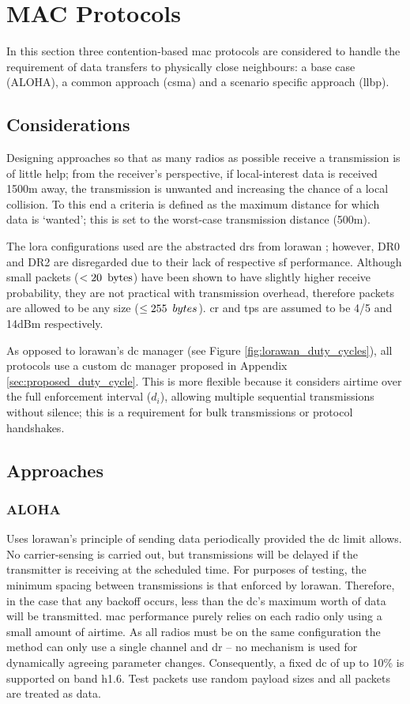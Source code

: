 \chapter{MAC Protocols}\label{sec:protocols}
In this section three contention-based \ac{mac} protocols are considered to handle the requirement of data transfers to physically close neighbours: a base case (ALOHA), a common approach (\ac{csma}) and a scenario specific approach (\ac{llbp}). 

\section{Considerations}\label{sec:mac_considerations}
Designing approaches so that as many radios as possible receive a transmission is of little help; from the receiver's perspective, if local-interest data is received 1500m away, the transmission is unwanted and increasing the chance of a local collision. To this end a criteria is defined as the maximum distance for which data is `wanted'; this is set to the worst-case transmission distance (500m).

The \ac{lora} configurations used are the abstracted \ac{dr}s from \ac{lorawan} \cite{3YP:LORAWAN_REGIONAL_PARAMS}; however, DR0 and DR2 are disregarded due to their lack of respective \ac{sf} performance. Although small packets ($< 20\enskip \text{bytes}$) have been shown to have slightly higher receive probability, they are not practical with transmission overhead, therefore packets are allowed to be any size ($\leq 255\enskip bytes$). \ac{cr} and \ac{tp}s are assumed to be 4/5 and 14dBm respectively.

As opposed to \ac{lorawan}'s \ac{dc} manager (see Figure \ref{fig:lorawan_duty_cycles}), all protocols use a custom \ac{dc} manager proposed in Appendix \ref{sec:proposed_duty_cycle}. This is  more flexible because it considers airtime over the full enforcement interval ($d_i$), allowing multiple sequential transmissions without silence; this is a requirement for bulk transmissions or protocol handshakes.

\section{Approaches}
\subsection{ALOHA}
Uses \ac{lorawan}'s principle of sending data periodically provided the \ac{dc} limit allows. No carrier-sensing is carried out, but transmissions will be delayed if the transmitter is receiving at the scheduled time. For purposes of testing, the minimum spacing between transmissions is that enforced by \ac{lorawan}. Therefore, in the case that any backoff occurs, less than the \ac{dc}'s maximum worth of data will be transmitted. \ac{mac} performance purely relies on each radio only using a small amount of airtime. As all radios must be on the same configuration the method can only use a single channel and \ac{dr} -- no mechanism is used for dynamically agreeing parameter changes. Consequently, a fixed \ac{dc} of up to 10\% is supported on band h1.6. Test packets use random payload sizes and all packets are treated as data.

